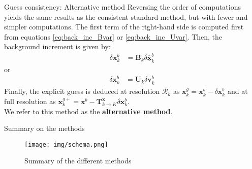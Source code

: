 \documentclass[10pt]{beamer}
\begin{document}
\begin{frame}{Guess consistency: Alternative method}
Reversing the order of computations yields the same results as the consistent standard method, but with fewer and simpler computations. The first term of the right-hand side is computed first from equations \eqref{eq:back_inc_Bvar} or \eqref{eq:back_inc_Uvar}. Then, the background increment is given by:
\begin{align}
\delta \mathbf{x}^b_k & = \mathbf{B}_k \delta \underline{\overline{\mathbf{x}}}^b_k
\end{align}
or
\begin{align}
\delta \mathbf{x}^b_k & = \mathbf{U}_k \delta \underline{\mathbf{v}}^b_k
\end{align}
Finally, the explicit guess is deduced at resolution $\mathcal{R}_k$ as $\mathbf{x}^g_k = \mathbf{x}^b_k - \delta \mathbf{x}^b_k$ and at full resolution as $\mathbf{x}^{g+}_k = \mathbf{x}^b - \mathbf{T}^\mathbf{x}_{k \rightarrow K} \delta \mathbf{x}^b_k$.\\
\vspace{+0.2cm}
We refer to this method as the \textbf{alternative method}.
\end{frame}

\begin{frame}{Summary on the methods}
\begin{center}
 \begin{figure}
 \label{fig:schema}
  \texttt{[image: img/schema.png]}
  \caption{Summary of the different methods}
 \end{figure}
\end{center}
\end{frame}
\end{document}
